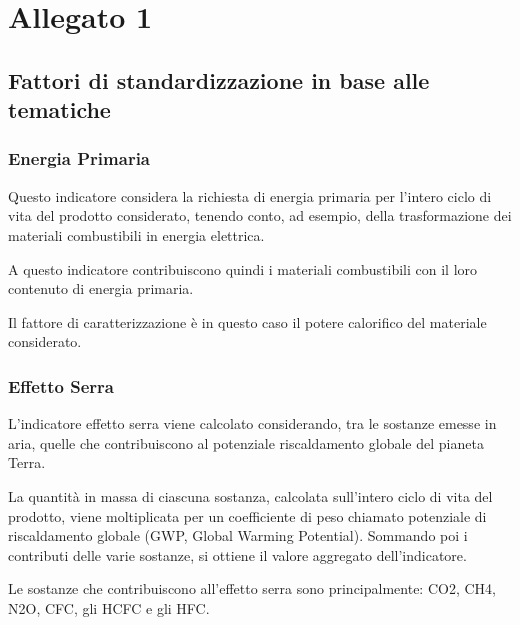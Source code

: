 \section*{Allegato 1}
\subsection*{Fattori di standardizzazione in base alle tematiche}\cite{RifAllegato}
\subsubsection*{Energia Primaria}

Questo indicatore considera la richiesta di energia primaria per l'intero ciclo di vita del prodotto considerato, tenendo conto, ad esempio, della trasformazione dei materiali combustibili in energia elettrica.

A questo indicatore contribuiscono quindi i materiali combustibili con il loro contenuto di energia primaria.

Il fattore di caratterizzazione è in questo caso il potere calorifico del materiale considerato.
\subsubsection*{Effetto Serra}
L'indicatore effetto serra viene calcolato considerando, tra le sostanze emesse in aria, quelle che contribuiscono al potenziale riscaldamento globale del pianeta Terra.

La quantità in massa di ciascuna sostanza, calcolata sull'intero ciclo di vita del prodotto, viene moltiplicata per un coefficiente di peso chiamato potenziale di riscaldamento globale (GWP, Global Warming Potential). Sommando poi i contributi delle varie sostanze, si ottiene il valore aggregato dell'indicatore.

Le sostanze che contribuiscono all'effetto serra sono principalmente: CO2, CH4, N2O, CFC, gli HCFC e gli HFC.


